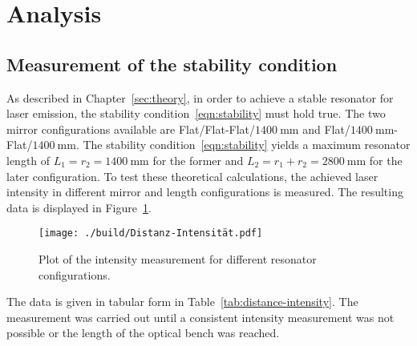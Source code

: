 \section{Analysis}
\subsection{Measurement of the stability condition}
As described in Chapter~\ref{sec:theory}, in order to achieve a stable resonator
for laser emission, the stability condition~\ref{eqn:stability} must hold true.
The two mirror configurations available are Flat/Flat-Flat/$\SI{1400}{\milli\meter}$ and
Flat/$\SI{1400}{\milli\meter}$-Flat/$\SI{1400}{\milli\meter}$. The stability condition~\ref{eqn:stability}
yields a maximum resonator length of $L_{1} = r_{2} = \SI{1400}{\milli\meter}$ for the former and
$L_{2} = r_{1} + r_{2} = \SI{2800}{\milli\meter}$ for the later configuration.
To test these theoretical calculations, the achieved laser intensity in different
mirror and length configurations is measured. The resulting data is displayed in Figure~\ref{fig:distance-intensity}.
\begin{figure}[H]
 \centering
 \texttt{[image: ./build/Distanz-Intensität.pdf]}
 \caption{Plot of the intensity measurement for different resonator configurations.}
 \label{fig:distance-intensity}
\end{figure}
\noindent
The data is given in tabular form in Table~\ref{tab:distance-intensity}.
The measurement was carried out until a consistent intensity measurement was not possible or the length of the
optical bench was reached.
